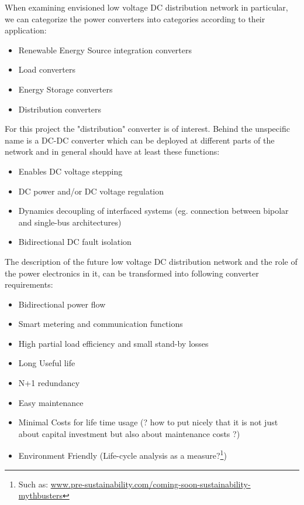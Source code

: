 \documentclass[]{scrreprt}
\begin{document}
When examining envisioned low voltage DC distribution network in particular, we can categorize the power converters into categories according to their application:
\begin{itemize}
	\item Renewable Energy Source integration converters
	\item Load converters
	\item Energy Storage converters
	\item Distribution converters
\end{itemize}

For this project the "distribution" converter is of interest. Behind the unspecific name is a DC-DC converter which can be deployed at different parts of the network and in general should have at least these functions:
\begin{itemize}
	\item Enables DC voltage stepping
	\item DC power and/or DC voltage regulation
	\item Dynamics decoupling of interfaced systems (eg. connection between bipolar and single-bus architectures)
	\item Bidirectional DC fault isolation
\end{itemize}

The description of the future  low voltage DC distribution network and the role of the power electronics in it, can be transformed into following converter requirements:

\begin{itemize}
	\item Bidirectional power flow
	\item Smart metering and communication functions \cite{Liserre2016}
	\item High partial load efficiency and small stand-by losses
	\item Long Useful life
	\item N+1 redundancy
	\item Easy maintenance 
	\item Minimal Costs for life time usage (? how to put nicely that it is not just about capital investment but also about maintenance costs ?)
	\item Environment Friendly (Life-cycle analysis as a measure?\footnote{Such as: \href{https://www.pre-sustainability.com/electric-vehicles-are-best-for-green-mobility-myth-or-not}{www.pre-sustainability.com/coming-soon-sustainability-mythbusters}})
\end{itemize}
\end{document}
